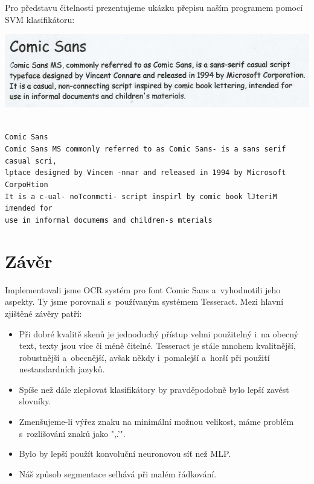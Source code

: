 \documentclass[12pt]{article}
\begin{document}
Pro představu čitelnosti prezentujeme ukázku přepisu naším programem pomocí SVM klasifikátoru:

{
\centering
\includegraphics[width=14cm,keepaspectratio]{example.jpg}
}

{\tt\footnotesize ~\\
Comic Sans\\
Comic Sans MS commonly referred to as Comic Sans- is a sans serif casual scri,\\
lptace designed by Vincem -nnar and released in 1994 by Microsoft CorpoHtion\\
It is a c-ual- noTconmcti- script inspirl by comic book lJteriM imended for\\
use in informal documems and children-s mterials
}


\section{Závěr}

Implementovali jsme OCR systém pro font Comic Sans a~vyhodnotili jeho aspekty. Ty jsme porovnali s~používaným systémem Tesseract. Mezi hlavní zjištěné závěry patří:

\begin{itemize}
  \item Při dobré kvalitě skenů je jednoduchý přístup velmi použitelný i~na obecný text, texty jsou více či méně čitelné. Tesseract je stále mnohem kvalitnější,
        robustnější a~obecnější, avšak někdy i~pomalejší a~horší při použití nestandardních jazyků.
  \item Spíše než dále zlepšovat klasifikátory by pravděpodobně bylo lepší zavést slovníky.
  \item Zmenšujeme-li výřez znaku na minimální možnou velikost, máme problém s~rozlišování znaků jako ",.'".
  \item Bylo by lepší použít konvoluční neuronovou síť než MLP.
  \item Náš způsob segmentace selhává při malém řádkování.
\end{itemize}


\begin{flushleft}
  
\end{flushleft}

\end{document}
